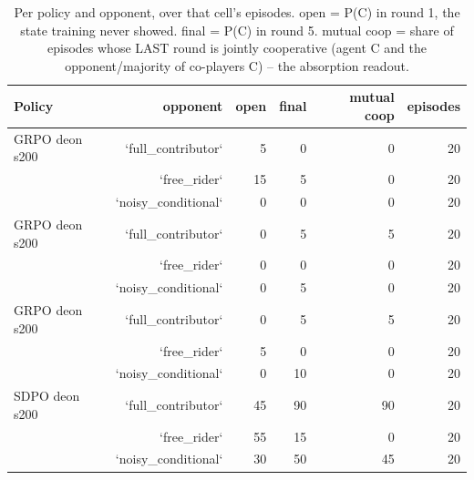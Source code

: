 \begin{table}[t]
\centering
\caption{Per policy and opponent, over that cell's episodes. open = P(C) in round 1, the state training never showed. final = P(C) in round 5. mutual coop = share of episodes whose LAST round is jointly cooperative (agent C and the opponent/majority of co-players C) -- the absorption readout.}
\label{tab:mr-outcomes}
\small
\setlength{\tabcolsep}{3.5pt}
\begin{tabular}{lrrrrr}
\toprule
Policy & opponent & open & final & mutual coop & episodes \\
\midrule
GRPO deon s200 & `full_contributor` & 5 & 0 & 0 & 20 \\
 & `free_rider` & 15 & 5 & 0 & 20 \\
 & `noisy_conditional` & 0 & 0 & 0 & 20 \\
GRPO deon s200 & `full_contributor` & 0 & 5 & 5 & 20 \\
 & `free_rider` & 0 & 0 & 0 & 20 \\
 & `noisy_conditional` & 0 & 5 & 0 & 20 \\
GRPO deon s200 & `full_contributor` & 0 & 5 & 5 & 20 \\
 & `free_rider` & 5 & 0 & 0 & 20 \\
 & `noisy_conditional` & 0 & 10 & 0 & 20 \\
SDPO deon s200 & `full_contributor` & 45 & 90 & 90 & 20 \\
 & `free_rider` & 55 & 15 & 0 & 20 \\
 & `noisy_conditional` & 30 & 50 & 45 & 20 \\
\bottomrule
\end{tabular}
\end{table}
